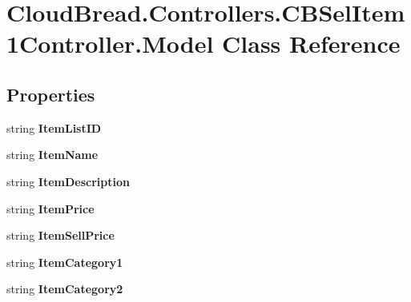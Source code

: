 \hypertarget{a00157}{}\section{Cloud\+Bread.\+Controllers.\+C\+B\+Sel\+Item1\+Controller.\+Model Class Reference}
\label{a00157}
\subsection*{Properties}
\begin{DoxyCompactItemize}
\item 
string {\bfseries Item\+List\+ID}\hypertarget{a00157_a3077af92ea1e1989d033ac123c80d1f1}{}\label{a00157_a3077af92ea1e1989d033ac123c80d1f1}

\item 
string {\bfseries Item\+Name}\hypertarget{a00157_a93d2656d316ad42916ea68f1f87e0d25}{}\label{a00157_a93d2656d316ad42916ea68f1f87e0d25}

\item 
string {\bfseries Item\+Description}\hypertarget{a00157_a0fb173c920100a961d92167549f37979}{}\label{a00157_a0fb173c920100a961d92167549f37979}

\item 
string {\bfseries Item\+Price}\hypertarget{a00157_a2037acfd02233ebb916984fcbd1174f6}{}\label{a00157_a2037acfd02233ebb916984fcbd1174f6}

\item 
string {\bfseries Item\+Sell\+Price}\hypertarget{a00157_acd47fa8a957ade7ce20d4b0e58a9a3b7}{}\label{a00157_acd47fa8a957ade7ce20d4b0e58a9a3b7}

\item 
string {\bfseries Item\+Category1}\hypertarget{a00157_a4416d170f9a2006658449c4d1226886a}{}\label{a00157_a4416d170f9a2006658449c4d1226886a}

\item 
string {\bfseries Item\+Category2}\hypertarget{a00157_af0f48be2a33910da9c78edfd34d2b227}{}\label{a00157_af0f48be2a33910da9c78edfd34d2b227}


\end{DoxyCompactItemize}
